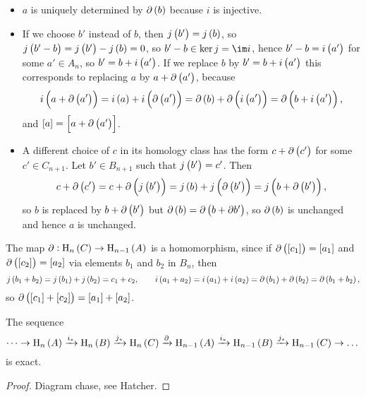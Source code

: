 \begin{itemize}
\item $ a $ is uniquely determined by $ \da\br{b} $ because $ i $ is injective.
\item If we choose $ b' $ instead of $ b $, then $ j\br{b'} = j\br{b} $, so $ j\br{b' - b} = j\br{b'} - j\br{b} = 0 $, so $ b' - b \in \ker j = \im i $, hence $ b' - b = i\br{a'} $ for some $ a' \in A_n $, so $ b' = b + i\br{a'} $. If we replace $ b $ by $ b' = b + i\br{a'} $ this corresponds to replacing $ a $ by $ a + \da\br{a'} $, because
$$ i\br{a + \da\br{a'}} = i\br{a} + i\br{\da\br{a'}} = \da\br{b} + \da\br{i\br{a'}} = \da\br{b + i\br{a'}}, $$
and $ \sbr{a} = \sbr{a + \da\br{a'}} $.
\item A different choice of $ c $ in its homology class has the form $ c + \da\br{c'} $ for some $ c' \in C_{n + 1} $. Let $ b' \in B_{n + 1} $ such that $ j\br{b'} = c' $. Then
$$ c + \da\br{c'} = c + \da\br{j\br{b'}} = j\br{b} + j\br{\da\br{b'}} = j\br{b + \da\br{b'}}, $$
so $ b $ is replaced by $ b + \da\br{b'} $ but $ \da\br{b} = \da\br{b + \da b'} $, so $ \da\br{b} $ is unchanged and hence $ a $ is unchanged.
\end{itemize}

\pagebreak

The map $ \da : \H_n\br{C} \to \H_{n - 1}\br{A} $ is a homomorphism, since if $ \da\br{\sbr{c_1}} = \sbr{a_1} $ and $ \da\br{\sbr{c_2}} = \sbr{a_2} $ via elements $ b_1 $ and $ b_2 $ in $ B_n $, then
$$ j\br{b_1 + b_2} = j\br{b_1} + j\br{b_2} = c_1 + c_2, \qquad i\br{a_1 + a_2} = i\br{a_1} + i\br{a_2} = \da\br{b_1} + \da\br{b_2} = \da\br{b_1 + b_2}, $$
so $ \da\br{\sbr{c_1} + \sbr{c_2}} = \sbr{a_1} + \sbr{a_2} $.

\begin{theorem}
The sequence
$$ \dots \to \H_n\br{A} \xrightarrow{i_*} \H_n\br{B} \xrightarrow{j_*} \H_n\br{C} \xrightarrow{\da} \H_{n - 1}\br{A} \xrightarrow{i_*} \H_{n - 1}\br{B} \xrightarrow{j_*} \H_{n - 1}\br{C} \to \dots $$
is exact.
\end{theorem}

\begin{proof}
Diagram chase, see Hatcher.
\end{proof}

